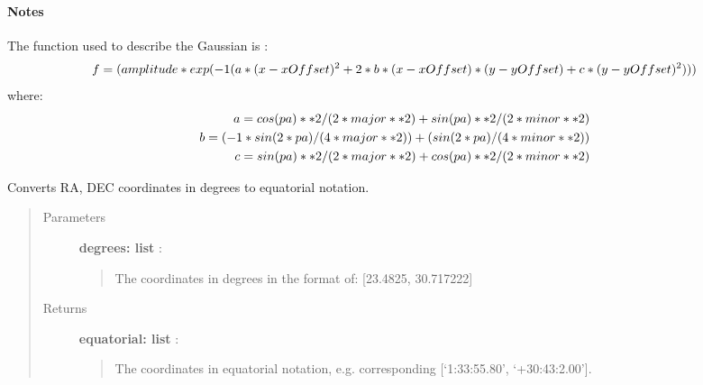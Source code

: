 \documentclass[a4paper,10pt,english]{sphinxmanual}
\begin{document}
\begin{fulllineitems}
\begin{quote}
\begin{description}
\end{description}\end{quote}
\paragraph{Notes}

The function used to describe the Gaussian is :
\begin{gather}
\begin{split}f = (amplitude * exp (-1 (a*(x-xOffset)^2 + 2*b*(x-xOffset)*(y-yOffset)
    + c*(y-yOffset)^2)))\end{split}\notag
\end{gather}
where:
\begin{gather}
\begin{split}a = cos(pa)**2/(2*major**2) + sin(pa)**2/(2*minor**2) \\
b = (-1*sin(2*pa)/(4*major**2))+(sin(2*pa)/(4*minor**2)) \\
c = sin(pa)**2/(2*major**2) + cos(pa)**2/(2*minor**2) \\\end{split}\notag
\end{gather}
\end{fulllineitems}


\begin{fulllineitems}
\label{functions:astrolyze.functions.astro_functions.degrees_to_equatorial}
Converts RA, DEC coordinates in degrees to equatorial notation.
\begin{quote}\begin{description}
\item[{Parameters }] \leavevmode
\textbf{degrees: list} :
\begin{quote}

The coordinates in degrees in the format of: {[}23.4825, 30.717222{]}
\end{quote}

\item[{Returns }] \leavevmode
\textbf{equatorial: list} :
\begin{quote}

The coordinates in equatorial notation, e.g.
corresponding {[}`1:33:55.80', `+30:43:2.00'{]}.
\end{quote}

\end{description}\end{quote}

\end{fulllineitems}
\end{document}
